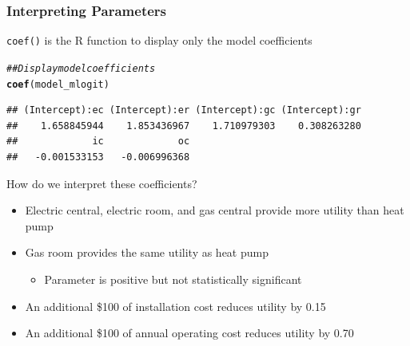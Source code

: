 \documentclass{beamer}\usepackage[]{graphicx}\usepackage[]{color}
\makeatletter
\newcommand{\hlcom}[1]{\textcolor[rgb]{0.678,0.584,0.686}{\textit{#1}}}%
\newcommand{\hlstd}[1]{\textcolor[rgb]{0.345,0.345,0.345}{#1}}%
\newcommand{\hlkwd}[1]{\textcolor[rgb]{0.737,0.353,0.396}{\textbf{#1}}}%
\newenvironment{kframe}{%
 \def\at@end@of@kframe{}%
 \ifinner\ifhmode%
  \def\at@end@of@kframe{\end{minipage}}%
  \begin{minipage}{\columnwidth}%
 \fi\fi%
 \def\FrameCommand##1{\hskip\@totalleftmargin \hskip-\fboxsep
 \colorbox{shadecolor}{##1}\hskip-\fboxsep
     \hskip-\linewidth \hskip-\@totalleftmargin \hskip\columnwidth}%
 \MakeFramed {\advance\hsize-\width
   \@totalleftmargin\z@ \linewidth\hsize
   \@setminipage}}%
 {\par\unskip\endMakeFramed%
 \at@end@of@kframe}
\newenvironment{knitrout}{}{} %
\makeatother
\begin{document}
\begin{frame}[fragile]\frametitle{Interpreting Parameters}
    \texttt{coef()} is the R function to display only the model coefficients
\begin{knitrout}\footnotesize
{}\color{fgcolor}\begin{kframe}
\begin{alltt}
\hlcom{## Display model coefficients}
\hlkwd{coef}\hlstd{(model_mlogit)}
\end{alltt}
\begin{verbatim}
## (Intercept):ec (Intercept):er (Intercept):gc (Intercept):gr 
##    1.658845944    1.853436967    1.710979303    0.308263280 
##             ic             oc 
##   -0.001533153   -0.006996368
\end{verbatim}
\end{kframe}
\end{knitrout}
    \vspace{2ex}
    How do we interpret these coefficients?
    \begin{itemize}
        \item Electric central, electric room, and gas central provide more utility than heat pump
        \item Gas room provides the same utility as heat pump
        \begin{itemize}
        	\item Parameter is positive but not statistically significant
        \end{itemize}
        \item An additional \$100 of installation cost reduces utility by 0.15
        \item An additional \$100 of annual operating cost reduces utility by 0.70
    \end{itemize}
\end{frame}
\end{document}
